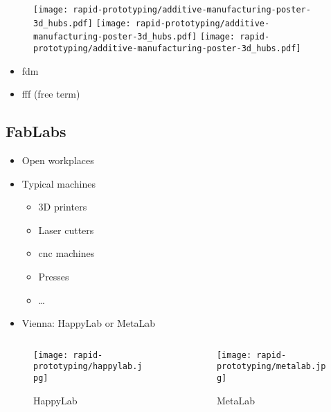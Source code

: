 \documentclass[aspectratio=169]{beamer}
\begin{document}
\subsubsection{}
\begin{frame}
    \begin{figure}
        \texttt{[image: rapid-prototyping/additive-manufacturing-poster-3d\_hubs.pdf]}
        \texttt{[image: rapid-prototyping/additive-manufacturing-poster-3d\_hubs.pdf]}
        \texttt{[image: rapid-prototyping/additive-manufacturing-poster-3d\_hubs.pdf]}
        \caption{}
    \end{figure}
    \begin{itemize}
        \item \gls{fdm} \texttrademark
        \item \gls{fff} (free term)
    \end{itemize}
\end{frame}

\subsection{FabLabs}
\begin{frame}
    \begin{itemize}
        \item Open workplaces
        \item Typical machines
              \begin{itemize}
                  \item 3D printers
                  \item Laser cutters
                  \item \acs{cnc} machines
                  \item Presses
                  \item \ldots
              \end{itemize}
        \item Vienna: HappyLab or MetaLab
    \end{itemize}
    \begin{columns}
        \begin{column}{0.55\textwidth}
            \begin{figure}
                \texttt{[image: rapid-prototyping/happylab.jpg]}
                \caption{HappyLab}
            \end{figure}
        \end{column}
        \begin{column}{0.45\textwidth}
            \begin{figure}
                \texttt{[image: rapid-prototyping/metalab.jpg]}
                \caption{MetaLab}
            \end{figure}
        \end{column}
    \end{columns}
\end{frame}
\end{document}
